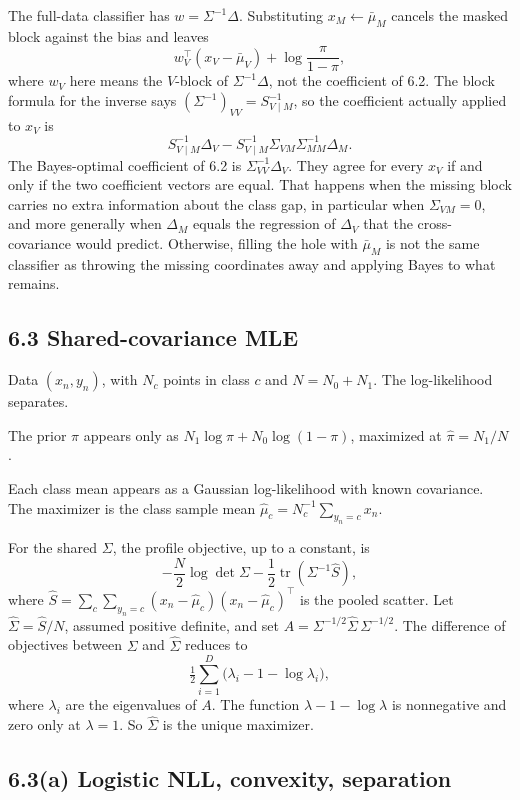 \documentclass[11pt]{article}
\theoremstyle{remark}
\newcommand{\tr}{\operatorname{tr}}
\begin{document}
The full-data classifier has \(w=\Sigma^{-1}\Delta\). Substituting \(x_M\leftarrow\bar\mu_M\) cancels the masked block against the bias and leaves
\[
w_V^\top(x_V-\bar\mu_V)+\log\frac{\pi}{1-\pi},
\]
where \(w_V\) here means the \(V\)-block of \(\Sigma^{-1}\Delta\), not the coefficient of 6.2. The block formula for the inverse says \((\Sigma^{-1})_{VV}=S_{V\mid M}^{-1}\), so the coefficient actually applied to \(x_V\) is
\[
S_{V\mid M}^{-1}\Delta_V
-S_{V\mid M}^{-1}\Sigma_{VM}\Sigma_{MM}^{-1}\Delta_M.
\]
The Bayes-optimal coefficient of 6.2 is \(\Sigma_{VV}^{-1}\Delta_V\). They agree for every \(x_V\) if and only if the two coefficient vectors are equal. That happens when the missing block carries no extra information about the class gap, in particular when \(\Sigma_{VM}=0\), and more generally when \(\Delta_M\) equals the regression of \(\Delta_V\) that the cross-covariance would predict. Otherwise, filling the hole with \(\bar\mu_M\) is not the same classifier as throwing the missing coordinates away and applying Bayes to what remains.

\subsection*{6.3 Shared-covariance MLE}

Data \((x_n,y_n)\), with \(N_c\) points in class \(c\) and \(N=N_0+N_1\). The log-likelihood separates.

The prior \(\pi\) appears only as \(N_1\log\pi+N_0\log(1-\pi)\), maximized at \(\hat\pi=N_1/N\).

Each class mean appears as a Gaussian log-likelihood with known covariance. The maximizer is the class sample mean \(\hat\mu_c=N_c^{-1}\sum_{y_n=c}x_n\).

For the shared \(\Sigma\), the profile objective, up to a constant, is
\[
-\frac N2\log\det\Sigma-\frac12\tr(\Sigma^{-1}\hat S),
\]
where \(\hat S=\sum_c\sum_{y_n=c}(x_n-\hat\mu_c)(x_n-\hat\mu_c)^\top\) is the pooled scatter. Let \(\hat\Sigma=\hat S/N\), assumed positive definite, and set \(A=\Sigma^{-1/2}\hat\Sigma\,\Sigma^{-1/2}\). The difference of objectives between \(\Sigma\) and \(\hat\Sigma\) reduces to
\[
\tfrac12\sum_{i=1}^D\big(\lambda_i-1-\log\lambda_i\big),
\]
where \(\lambda_i\) are the eigenvalues of \(A\). The function \(\lambda-1-\log\lambda\) is nonnegative and zero only at \(\lambda=1\). So \(\hat\Sigma\) is the unique maximizer.

\subsection*{6.3(a) Logistic NLL, convexity, separation}
\end{document}
